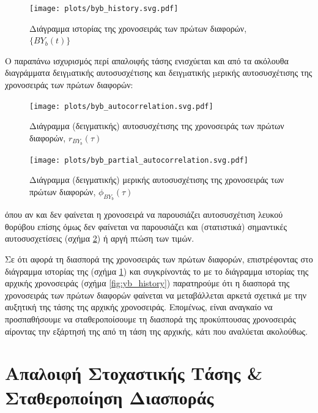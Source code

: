 \begin{figure}[H]
    \begin{center}
        \texttt{[image: plots/byb\_history.svg.pdf]}
        \caption{Διάγραμμα ιστορίας της χρονοσειράς των πρώτων διαφορών, $\{BY_b(t)\}$}
        \label{fig:byb_history}
    \end{center}
\end{figure}

Ο παραπάνω ισχυρισμός περί απαλοιφής τάσης ενισχύεται και από τα ακόλουθα διαγράμματα δειγµατικής αυτοσυσχέτισης και δειγµατικής µερικής αυτοσυσχέτισης της χρονοσειράς των πρώτων διαφορών:

\begin{figure}[H]
    \begin{center}
        \texttt{[image: plots/byb\_autocorrelation.svg.pdf]}
        \caption{Διάγραμμα (δειγματικής) αυτοσυσχέτισης της χρονοσειράς των πρώτων διαφορών, $r_{BY_b}(\tau)$}
        \label{fig:byb_autocorrelation}
    \end{center}
\end{figure}

\begin{figure}[H]
    \begin{center}
        \texttt{[image: plots/byb\_partial\_autocorrelation.svg.pdf]}
        \caption{Διάγραμμα (δειγματικής) μερικής αυτοσυσχέτισης της χρονοσειράς των πρώτων διαφορών, $\phi_{BY_b}(\tau)$}
        \label{fig:byb_partial_autocorrelation}
    \end{center}
\end{figure}

όπου αν και δεν φαίνεται η χρονοσειρά να παρουσιάζει αυτοσυσχέτιση λευκού θορύβου επίσης όμως δεν φαίνεται να παρουσιάζει και (στατιστικά) σημαντικές αυτοσυσχετίσεις (σχήμα \ref{fig:byb_autocorrelation}) ή αργή πτώση των τιμών. 

Σε ότι αφορά τη διασπορά της χρονοσειράς των πρώτων διαφορών, επιστρέφοντας στο διάγραμμα ιστορίας της (σχήμα \ref{fig:byb_history}) και συγκρίνοντάς το με το διάγραμμα ιστορίας της αρχικής χρονοσειράς (σχήμα \ref{fig:yb_history}) παρατηρούμε ότι η διασπορά της χρονοσειράς των πρώτων διαφορών φαίνεται να μεταβάλλεται αρκετά σχετικά με την αυξητική  της τάσης της αρχικής χρονοσειράς. Επομένως, είναι αναγκαίο να προσπαθήσουμε να σταθεροποίσουμε τη διασπορά της προκύπτουσας χρονοσειράς αίροντας την εξάρτησή της από τη τάση της αρχικής, κάτι που αναλύεται ακολούθως.

\section{Απαλοιφή Στοχαστικής Τάσης \& Σταθεροποίηση Διασποράς}

